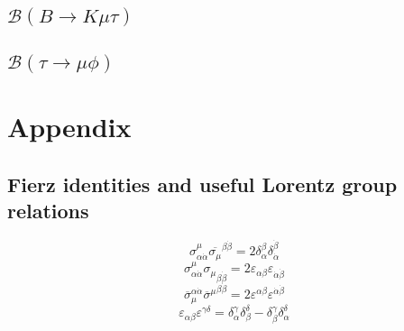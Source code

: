 \documentclass{article}
\begin{document}
\subsection{$\mathcal{B}(B \rightarrow K \mu \tau)$}
\subsection{$\mathcal{B}(\tau \rightarrow \mu \phi)$}




\section{Appendix}
\subsection{Fierz identities and useful Lorentz group relations}
\[
\sigma_{\alpha \dot{\alpha}}^\mu \overline{\sigma_\mu}^{\beta \dot{\beta}}= 2\delta^\beta_\alpha \delta^{\dot{\beta}}_{\dot{\alpha}}
\]
\[
\sigma_{\alpha \dot{\alpha}}^\mu {\sigma_{\mu}}_{\beta \dot{\beta}}= 2 \varepsilon_{\alpha \beta} \varepsilon_{\dot{\alpha} \dot{\beta}} 
\]
\[
\overline{\sigma}_\mu^{\alpha \dot{\alpha}} {\overline{\sigma}^{\mu}}^{\beta \dot{\beta}}= 2 \varepsilon^{\alpha \beta} \varepsilon^{\dot{\alpha} \dot{\beta}} 
\]
\[
\varepsilon_{\alpha \beta} \varepsilon^{\gamma \delta} = \delta_\alpha^\gamma \delta_\beta^\delta - \delta_\beta^\gamma \delta_\alpha^\delta
\]
\end{document}
